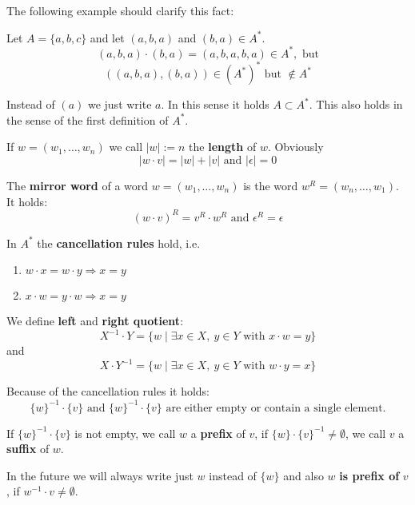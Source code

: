 The following example should clarify this fact: 

Let $A = \{a,b,c\}$ and let $(a,b,a)$ and $(b,a) \in A^*$.
\[(a,b,a)\cdot(b,a) = (a,b,a,b,a) \in A^*,\mbox{ but} \]
\[((a,b,a),(b,a)) \in (A^*)^*\mbox{ but }\notin A^* \]

Instead of $(a)$ we just write $a$. In this sense it holds $A \subset A^*$. This
also holds in the sense of the first definition of $A^*$.

If $w = (w_1, \ldots, w_n)$ we call $|w| := n$ the {\bf length} of $w$.
Obviously 
\[|w \cdot v| = |w| + |v|\mbox{ and }|\epsilon| = 0\]

The {\bf mirror word} of a word $w = (w_1,\ldots,w_n)$ is the word
$w^R = (w_n,\ldots,w_1)$. It holds:
\[ (w \cdot v)^R = v^R \cdot w^R \text{ and }\epsilon^R = \epsilon \]

In $A^*$ the {\bf cancellation rules} hold, i.e.
\begin{enumerate}
  \item $w \cdot x = w \cdot y \Rightarrow x = y$
  \item $x \cdot w = y \cdot w \Rightarrow x = y$
\end{enumerate}

We define {\bf left} and {\bf right quotient}:
\[ X^{-1} \cdot Y = \{ w \mid \exists x \in X,\ y \in Y\mbox{ with }x \cdot w
= y \} \] 
and 
\[ X \cdot Y^{-1} = \{ w \mid \exists x \in X,\ y \in Y\mbox{ with } w \cdot y
= x \} \]

Because of the cancellation rules it holds:
\[ \{w\}^{-1} \cdot \{v\}\mbox{ and } \{ w \}^{-1} \cdot \{ v \}\mbox{ are
either empty or contain a single element.} \]

If $\{ w \}^{-1} \cdot \{ v \}$ is not empty, we call $w$ a {\bf prefix} of $v$,
if $\{ w \} \cdot \{ v \}^{-1} \not= \emptyset$, we call $v$ a {\bf suffix} of
$w$.

In the future we will always write just $w$ instead of $\{ w \}$ and also $w$
{\bf is prefix of} $v$, if $w^{-1} \cdot v \not= \emptyset$.
